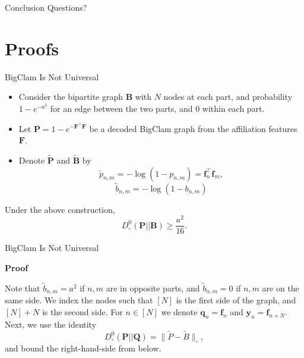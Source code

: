 \documentclass{beamer}
\begin{document}
\begin{frame}{Conclusion}
    \Huge
    Questions?
\end{frame}







\section{Proofs}
\begin{frame}{BigClam Is Not Universal}
\begin{itemize}[itemsep=0.5em, label=\textbullet]
 
\item Consider the bipartite graph $\mathbf{B}$ with $N$ nodes at each part, and probability $1-e^{-a^2}$ for an edge between the two parts, and $0$ within each part.  
\item Let $\mathbf{P} = 1-e^{-\mathbf{F}^\top \mathbf{F}}$ be a decoded BigClam graph from the affiliation features $\mathbf{F}$.

\item Denote $\tilde{\mathbf{P}}$ and $\tilde{\mathbf{B}}$ by  
\[\tilde{p}_{n,m}=-\log(1-p_{n,m})=\mathbf{f}_n^\top\mathbf{f}_m,\] 
\[\tilde{b}_{n,m}=-\log(1-b_{n,m})\]
\end{itemize}    
\begin{claim}
    Under the above construction, 
    \[D^0_{\square}(\mathbf{P} || \mathbf{B}) \geq \frac{a^2}{16}.\]
\end{claim}

\end{frame}

\begin{frame}{BigClam Is Not Universal}

 \textbf{Proof}

Note that $\tilde{b}_{n,m}=a^2$ if $n,m$ are in opposite parts, and $\tilde{b}_{n,m}=0$ if $n,m$ are on the same side.
We index the nodes such that $[N]$ is the first side of the graph, and $[N]+N$ is the second side. For $n\in[N]$ we denote $\mathbf{q}_n=\mathbf{f}_n$ and  $\mathbf{y}_n=\mathbf{f}_{n+N}$.
Next, we use the identity 
\[D^0_{\square}(\mathbf{P} || \mathbf{Q}) = \| \tilde{P}-\tilde{B}\|_{\square },\]
and bound the right-hand-side from below.
\end{frame}
\end{document}
